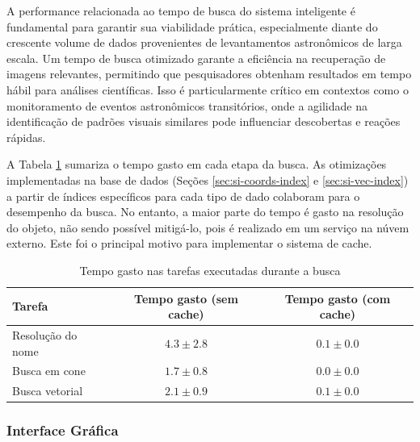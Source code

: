 A performance relacionada ao tempo de busca do sistema inteligente é fundamental para garantir sua viabilidade prática, especialmente diante do crescente volume de dados provenientes de levantamentos astronômicos de larga escala. Um tempo de busca otimizado garante a eficiência na recuperação de imagens relevantes, permitindo que pesquisadores obtenham resultados em tempo hábil para análises científicas. Isso é particularmente crítico em contextos como o monitoramento de eventos astronômicos transitórios, onde a agilidade na identificação de padrões visuais similares pode influenciar descobertas e reações rápidas.

A Tabela \ref{tab:times} sumariza o tempo gasto em cada etapa da busca. As otimizações implementadas na base de dados (Seções \ref{sec:si-coords-index} e \ref{sec:si-vec-index}) a partir de índices específicos para cada tipo de dado colaboram para o desempenho da busca. No entanto, a maior parte do tempo é gasto na resolução do objeto, não sendo possível mitigá-lo, pois é realizado em um serviço na núvem externo. Este foi o principal motivo para implementar o sistema de cache.


\begin{table}[!ht]
  \centering
  \begin{tabular}{lcc}
    \toprule
    Tarefa            & Tempo gasto (sem cache) & Tempo gasto (com cache) \\
    \midrule
    Resolução do nome & $4.3 \pm 2.8$           & $0.1 \pm 0.0$           \\
    Busca em cone     & $1.7 \pm 0.8$           & $0.0 \pm 0.0$           \\
    Busca vetorial    & $2.1 \pm 0.9$           & $0.1 \pm 0.0$           \\
    \bottomrule
  \end{tabular}
  \caption{Tempo gasto nas tarefas executadas durante a busca}
  \label{tab:times}
\end{table}



\subsubsection{Interface Gráfica}
\label{sec:sist-ui}

